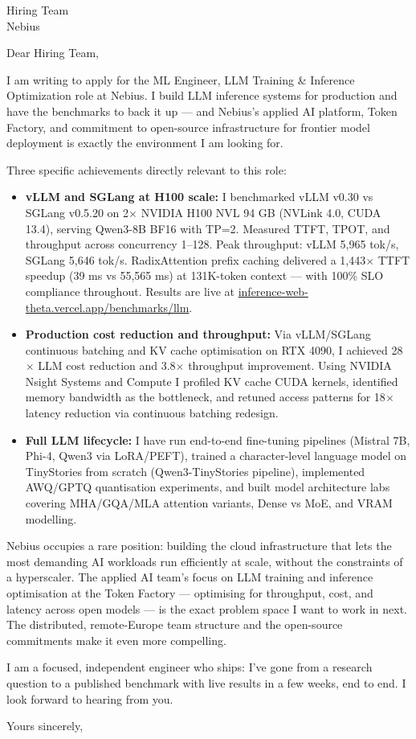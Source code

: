 \documentclass[a4paper]{letter}
\date{\today}
\begin{document}
\begin{letter}{Hiring Team \\ Nebius}

\opening{Dear Hiring Team,}

I am writing to apply for the ML Engineer, LLM Training \& Inference Optimization role at Nebius. I build LLM inference systems for production and have the benchmarks to back it up — and Nebius's applied AI platform, Token Factory, and commitment to open-source infrastructure for frontier model deployment is exactly the environment I am looking for.

Three specific achievements directly relevant to this role:

\begin{itemize}
  \item \textbf{vLLM and SGLang at H100 scale:} I benchmarked vLLM v0.30 vs SGLang v0.5.20 on 2$\times$ NVIDIA H100 NVL 94 GB (NVLink 4.0, CUDA 13.4), serving Qwen3-8B BF16 with TP=2. Measured TTFT, TPOT, and throughput across concurrency 1--128. Peak throughput: vLLM 5,965 tok/s, SGLang 5,646 tok/s. RadixAttention prefix caching delivered a 1,443$\times$ TTFT speedup (39 ms vs 55,565 ms) at 131K-token context — with 100\% SLO compliance throughout. Results are live at \href{https://inference-web-theta.vercel.app/benchmarks/llm}{inference-web-theta.vercel.app/benchmarks/llm}.
  \item \textbf{Production cost reduction and throughput:} Via vLLM/SGLang continuous batching and KV cache optimisation on RTX 4090, I achieved 28$\times$ LLM cost reduction and 3.8$\times$ throughput improvement. Using NVIDIA Nsight Systems and Compute I profiled KV cache CUDA kernels, identified memory bandwidth as the bottleneck, and retuned access patterns for 18$\times$ latency reduction via continuous batching redesign.
  \item \textbf{Full LLM lifecycle:} I have run end-to-end fine-tuning pipelines (Mistral 7B, Phi-4, Qwen3 via LoRA/PEFT), trained a character-level language model on TinyStories from scratch (Qwen3-TinyStories pipeline), implemented AWQ/GPTQ quantisation experiments, and built model architecture labs covering MHA/GQA/MLA attention variants, Dense vs MoE, and VRAM modelling.
\end{itemize}

Nebius occupies a rare position: building the cloud infrastructure that lets the most demanding AI workloads run efficiently at scale, without the constraints of a hyperscaler. The applied AI team's focus on LLM training and inference optimisation at the Token Factory — optimising for throughput, cost, and latency across open models — is the exact problem space I want to work in next. The distributed, remote-Europe team structure and the open-source commitments make it even more compelling.

I am a focused, independent engineer who ships: I've gone from a research question to a published benchmark with live results in a few weeks, end to end. I look forward to hearing from you.

\closing{Yours sincerely,}

\end{letter}
\end{document}
